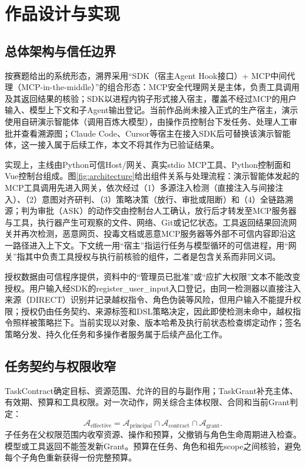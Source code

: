 \chapter{作品设计与实现}
\section{总体架构与信任边界}
按赛题给出的系统形态，溯界采用“SDK（宿主Agent Hook接口）+ MCP中间代理（MCP-in-the-middle）”的组合形态：MCP安全代理网关是主体，负责工具调用及其返回结果的核验；SDK以进程内钩子形式接入宿主，覆盖不经过MCP的用户输入、模型上下文和子Agent输出登记。当前作品尚未接入正式的生产宿主，演示使用自研演示智能体（调用百炼大模型），由操作员控制台下发任务、处理人工审批并查看溯源图；Claude Code、Cursor等宿主在接入SDK后可替换该演示智能体，这一接入属于后续工作，本文不将其作为已验证结果。

实现上，主线由Python可信Host/网关、真实stdio MCP工具、Python控制面和Vue控制台组成。图\ref{fig:architecture}给出组件关系与处理流程：演示智能体发起的MCP工具调用先进入网关，依次经过（1）多源注入检测（直接注入与间接注入）、（2）意图对齐研判、（3）策略决策（放行、审批或阻断）和（4）全链路溯源；判为审批（ASK）的动作交由控制台人工确认，放行后才转发至MCP服务器与工具，执行器产生可观察的文件、网络、Git或记忆状态。工具返回结果回流网关并再次检测，恶意网页、投毒文档或恶意MCP服务器等外部不可信内容即沿这一路径进入上下文。下文统一用“宿主”指运行任务与模型循环的可信进程，用“网关”指其中负责工具授权与执行前核验的组件，二者是包含关系而非同义词。



授权数据由可信程序提供，资料中的“管理员已批准”或“应扩大权限”文本不能改变授权。用户输入经SDK的register\_user\_input入口登记，由同一检测器以直接注入来源（DIRECT）识别并记录越权指令、角色伪装等风险，但用户输入不能提升权限；授权仍由任务契约、来源标签和DSL策略决定，因此即使检测未命中，越权指令照样被策略拦下。当前实现以对象、版本哈希及执行前状态检查绑定动作；签名策略分发、持久化任务和多操作者服务属于后续产品化工作。

\section{任务契约与权限收窄}
TaskContract确定目标、资源范围、允许的目的与副作用；TaskGrant补充主体、有效期、预算和工具权限。对一次动作，网关综合主体权限、合同和当前Grant判定：
\begin{equation}
\mathcal A_{\mathrm{effective}}=\mathcal A_{\mathrm{principal}}\cap\mathcal A_{\mathrm{contract}}\cap\mathcal A_{\mathrm{grant}}.
\end{equation}
子任务在父权限范围内收窄资源、操作和预算，父撤销与角色生命周期进入检查。模型或工具返回不能签发新Grant。预算在任务、角色和祖先scope之间核验，避免每个子角色重新获得一份完整预算。

